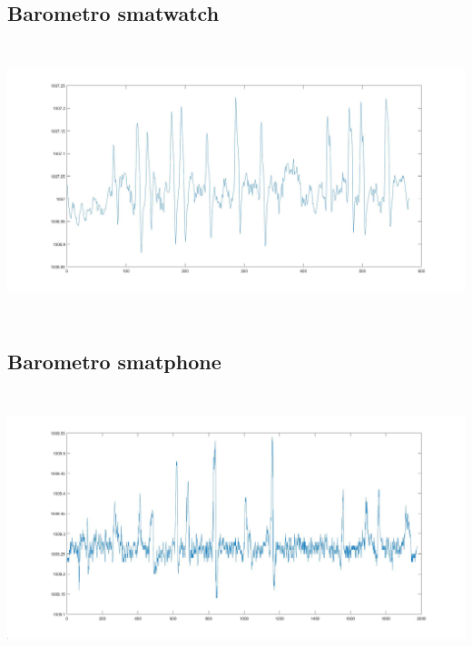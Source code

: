 \documentclass[a4paper, oneside]{book}
\begin{document}
\subsection{Barometro smatwatch\\} 
\begin{minipage}{\linewidth}
\begin{center}
\includegraphics[width=160mm, height= 80mm]{./images/registrazione_tesi/pressure_phone.jpg} 
\end{center}
\end{minipage}
\makebox[\linewidth]{}
\makebox[\linewidth]{}\makebox[\linewidth]{}\makebox[\linewidth]{}
\makebox[\linewidth]{}\makebox[\linewidth]{}\makebox[\linewidth]{}
\makebox[\linewidth]{}\makebox[\linewidth]{}\makebox[\linewidth]{}
\makebox[\linewidth]{}\makebox[\linewidth]{}\makebox[\linewidth]{}

\subsection{Barometro smatphone\\} 
\makebox[\linewidth]{}
\begin{minipage}{\linewidth}
\begin{center}
\includegraphics[width=160mm, height= 80mm]{./images/registrazione_tesi/pressure_watch.jpg} 
\end{center}
\end{minipage}
\end{document}
